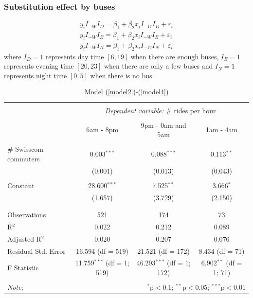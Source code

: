 \documentclass{article}
\begin{document}
\subsubsection{Substitution effect by buses}
\begin{align}
    y_i I_{-W} I_D = \beta_1 + \beta_2 x_i I_{-W} I_D + \varepsilon_i \label{model2} \\
    y_i I_{-W} I_E = \beta_1 + \beta_2 x_i I_{-W} I_E + \varepsilon_i \label{model3}\\
    y_i I_{-W} I_N = \beta_1 + \beta_2 x_i I_{-W} I_N + \varepsilon_i \label{model4}
\end{align}
where $I_D = 1$ represents day time $[6,19]$ when there are enough buses, $I_E = 1$ represents evening time $[20,23]$ when there are only a few buses and $I_N = 1$ represents night time $[0,5]$ when there is no bus.

\begin{table}[!htbp] \centering 
  \caption{Model (\ref{model2})-(\ref{model4})} 
  \label{} 
\begin{tabular}{@{\extracolsep{5pt}}lccc} 
\\[-1.8ex]\hline 
\hline \\[-1.8ex] 
 & \multicolumn{3}{c}{\textit{Dependent variable:} \# rides per hour}\\ 
\cline{2-4} 
\\[-1.8ex] & 6am - 8pm & 9pm - 0am and 5am & 1am - 4am\\ 
\hline \\[-1.8ex] 
 \# Swisscom commuters & 0.003$^{***}$ & 0.088$^{***}$ & 0.113$^{**}$ \\ 
  & (0.001) & (0.013) & (0.043) \\ 
  & & & \\ 
 Constant & 28.600$^{***}$ & 7.525$^{**}$ & 3.666$^{*}$ \\ 
  & (1.657) & (3.729) & (2.150) \\ 
  & & & \\ 
\hline \\[-1.8ex] 
Observations & 521 & 174 & 73 \\ 
R$^{2}$ & 0.022 & 0.212 & 0.089 \\ 
Adjusted R$^{2}$ & 0.020 & 0.207 & 0.076 \\ 
Residual Std. Error & 16.594 (df = 519) & 21.521 (df = 172) & 8.434 (df = 71) \\ 
F Statistic & 11.759$^{***}$ (df = 1; 519) & 46.293$^{***}$ (df = 1; 172) & 6.902$^{**}$ (df = 1; 71) \\ 
\hline 
\hline \\[-1.8ex] 
\textit{Note:}  & \multicolumn{3}{r}{$^{*}$p$<$0.1; $^{**}$p$<$0.05; $^{***}$p$<$0.01} \\ 
\end{tabular} 
\end{table} 
\end{document}
